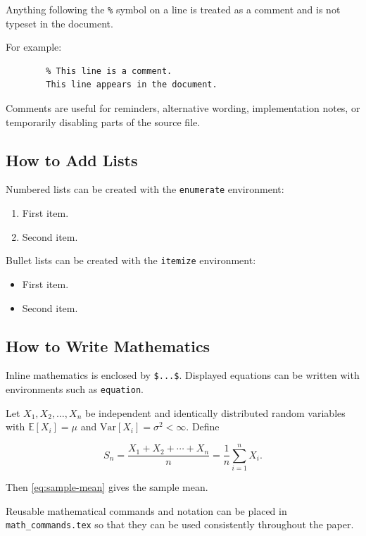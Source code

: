 \documentclass{article}
\begin{document}
	Anything following the \verb|%| symbol on a line is treated as a comment and is not typeset in the document.
	
	For example:
	
	\begin{verbatim}
		% This line is a comment.
		This line appears in the document.
	\end{verbatim}
	
	Comments are useful for reminders, alternative wording, implementation notes, or temporarily disabling parts of the source file.
	
	
	\subsection{How to Add Lists}
	
	Numbered lists can be created with the \texttt{enumerate} environment:
	
	\begin{enumerate}
		\item First item.
		\item Second item.
	\end{enumerate}
	
	Bullet lists can be created with the \texttt{itemize} environment:
	
	\begin{itemize}
		\item First item.
		\item Second item.
	\end{itemize}
	
	
	\subsection{How to Write Mathematics}
	
	Inline mathematics is enclosed by \verb|$...$|. Displayed equations can be written with environments such as \texttt{equation}.
	
	Let $X_1, X_2, \ldots, X_n$ be independent and identically distributed random variables with $\mathbb{E}[X_i] = \mu$ and $\mathrm{Var}[X_i] = \sigma^2 < \infty$. Define
	
	\begin{equation}
		S_n = \frac{X_1 + X_2 + \cdots + X_n}{n}
		= \frac{1}{n}\sum_{i=1}^{n} X_i.
		\label{eq:sample-mean}
	\end{equation}
	
	Then \cref{eq:sample-mean} gives the sample mean.
	
	Reusable mathematical commands and notation can be placed in \texttt{math\_commands.tex} so that they can be used consistently throughout the paper.
	
\end{document}
